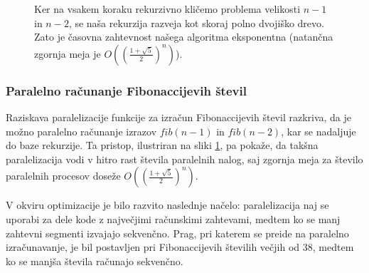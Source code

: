 \documentclass[mat1, tisk]{fmfdelo}
\begin{document}
\begin{figure}[htb]
  \centering
  \caption{Ker na vsakem koraku rekurzivno kličemo problema velikosti $n-1$ in $n-2$, se naša rekurzija razveja
  kot skoraj polno dvojiško drevo. Zato je časovna zahtevnost našega algoritma eksponentna (natančna zgornja meja je 
  $O((\frac{1 + \sqrt{5}}{2})^n)$).}
  \label{fig:fib-graph}
\end{figure}


\subsubsection{Paralelno računanje Fibonaccijevih števil}

Raziskava paralelizacije funkcije za izračun Fibonaccijevih števil razkriva, da je možno paralelno računanje izrazov
$fib(n-1)$ in $fib(n-2)$, kar se nadaljuje do baze rekurzije. Ta pristop, ilustriran na sliki \ref{fig:fib-graph}, pa
pokaže, da takšna paralelizacija vodi v hitro rast števila paralelnih nalog, saj zgornja meja za število paralelnih
procesov doseže $O((\frac{1 + \sqrt{5}}{2})^n)$.

V okviru optimizacije je bilo razvito naslednje načelo: paralelizacija naj se uporabi za dele kode z največjimi
računskimi zahtevami, medtem ko se manj zahtevni segmenti izvajajo sekvenčno. Prag, pri katerem se preide na paralelno
izračunavanje, je bil postavljen pri Fibonaccijevih številih večjih od $38$, medtem ko se manjša števila računajo sekvenčno.
\end{document}
